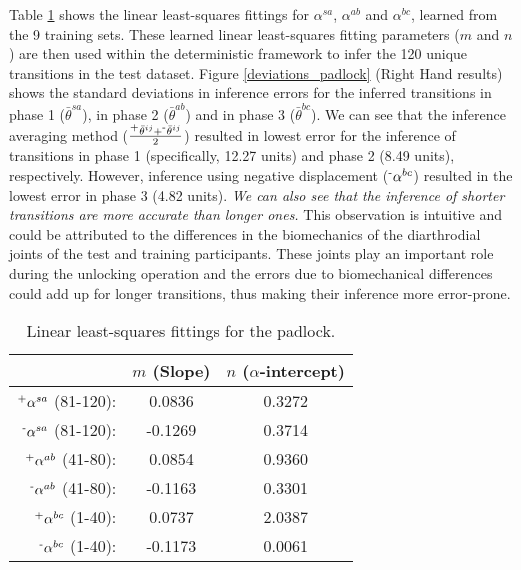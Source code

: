 \documentclass[]{IEEEtran}
\begin{document}
Table \ref{padlocklines} shows the linear least-squares fittings for $\alpha^{sa}$, $\alpha^{ab}$ and $\alpha^{bc}$, learned from the 9 training sets. These learned linear least-squares fitting parameters ($m$ and $n$) are then used within the deterministic framework to infer the 120 unique transitions in the test dataset. 
Figure \ref{deviations_padlock} (Right Hand results) shows the standard deviations in inference errors for the inferred transitions in phase 1 ($\bar{\theta}^{sa}$), in phase 2 ($\bar{\theta}^{ab}$) and in phase 3 ($\bar{\theta}^{bc}$). We can see that the inference averaging method ($\frac{\textsuperscript{+}\bar{\theta}^{ij}+\textsuperscript{-}\bar{\theta}^{ij}}{2}$) resulted in lowest error for the inference of transitions in phase 1 (specifically, 12.27 units) and phase 2 (8.49 units), respectively. However, inference using negative displacement ($\textsuperscript{-}\alpha^{bc}$) resulted in the lowest error in phase 3 (4.82 units). \emph{We can also see that the inference of shorter transitions are more accurate than longer ones.} This observation is intuitive and could be attributed to the differences in the biomechanics of the diarthrodial joints \cite{mow2012biomechanics} of the test and training participants. These joints play an important role during the unlocking operation and the errors due to biomechanical differences could add up for longer transitions, thus making their inference more error-prone.

\begin{table}[t]
  \centering
  \scriptsize
  \caption{Linear least-squares fittings for the padlock.}
    \begin{tabular}{rcc}
    \toprule
          & $m$ (Slope) & $n$ ($\alpha$-intercept) \\
    \midrule
    $\textsuperscript{+}\alpha^{sa}$ (81-120): & 0.0836 & 0.3272 \\
    $\textsuperscript{-}\alpha^{sa}$ (81-120): & -0.1269 & 0.3714 \\
    $\textsuperscript{+}\alpha^{ab}$ (41-80): & 0.0854 & 0.9360 \\
    $\textsuperscript{-}\alpha^{ab}$ (41-80): & -0.1163 & 0.3301 \\
    $\textsuperscript{+}\alpha^{bc}$ (1-40): & 0.0737 & 2.0387 \\
    $\textsuperscript{-}\alpha^{bc}$ (1-40): & -0.1173 & 0.0061 \\
    \bottomrule
    \end{tabular}
  \label{padlocklines}
\end{table}
\end{document}
